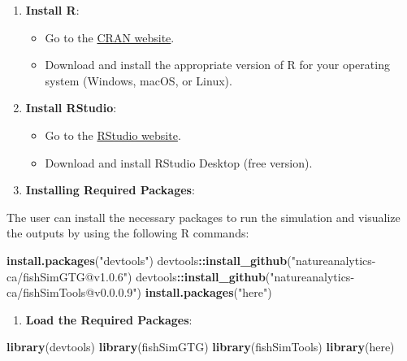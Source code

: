 \documentclass[
]{book}
\newenvironment{Shaded}{\begin{snugshade}}{\end{snugshade}}
\newcommand{\FunctionTok}[1]{\textcolor[rgb]{0.13,0.29,0.53}{\textbf{#1}}}
\newcommand{\NormalTok}[1]{#1}
\newcommand{\SpecialCharTok}[1]{\textcolor[rgb]{0.81,0.36,0.00}{\textbf{#1}}}
\newcommand{\StringTok}[1]{\textcolor[rgb]{0.31,0.60,0.02}{#1}}
\providecommand{\tightlist}{%
  \setlength{\itemsep}{0pt}\setlength{\parskip}{0pt}}
\begin{document}
\begin{enumerate}
\def\labelenumi{\arabic{enumi}.}
\item
  \textbf{Install R}:

  \begin{itemize}
  \tightlist
  \item
    Go to the \href{https://cran.r-project.org/}{CRAN website}.
  \item
    Download and install the appropriate version of R for your operating system (Windows, macOS, or Linux).
  \end{itemize}
\item
  \textbf{Install RStudio}:

  \begin{itemize}
  \tightlist
  \item
    Go to the \href{https://www.rstudio.com/products/rstudio/download/}{RStudio website}.
  \item
    Download and install RStudio Desktop (free version).
  \end{itemize}
\item
  \textbf{Installing Required Packages}:
\end{enumerate}

The user can install the necessary packages to run the simulation and visualize the outputs by using the following R commands:

\begin{Shaded}
\begin{Highlighting}[]
\FunctionTok{install.packages}\NormalTok{(}\StringTok{"devtools"}\NormalTok{)}
\NormalTok{devtools}\SpecialCharTok{::}\FunctionTok{install\_github}\NormalTok{(}\StringTok{"natureanalytics{-}ca/fishSimGTG@v1.0.6"}\NormalTok{)}
\NormalTok{devtools}\SpecialCharTok{::}\FunctionTok{install\_github}\NormalTok{(}\StringTok{"natureanalytics{-}ca/fishSimTools@v0.0.0.9"}\NormalTok{)}
\FunctionTok{install.packages}\NormalTok{(}\StringTok{"here"}\NormalTok{)}
\end{Highlighting}
\end{Shaded}

\begin{enumerate}
\def\labelenumi{\arabic{enumi}.}
\setcounter{enumi}{3}
\tightlist
\item
  \textbf{Load the Required Packages}:
\end{enumerate}

\begin{Shaded}
\begin{Highlighting}[]
\FunctionTok{library}\NormalTok{(devtools)}
\FunctionTok{library}\NormalTok{(fishSimGTG)}
\FunctionTok{library}\NormalTok{(fishSimTools)}
\FunctionTok{library}\NormalTok{(here)}
\end{Highlighting}
\end{Shaded}
\end{document}
